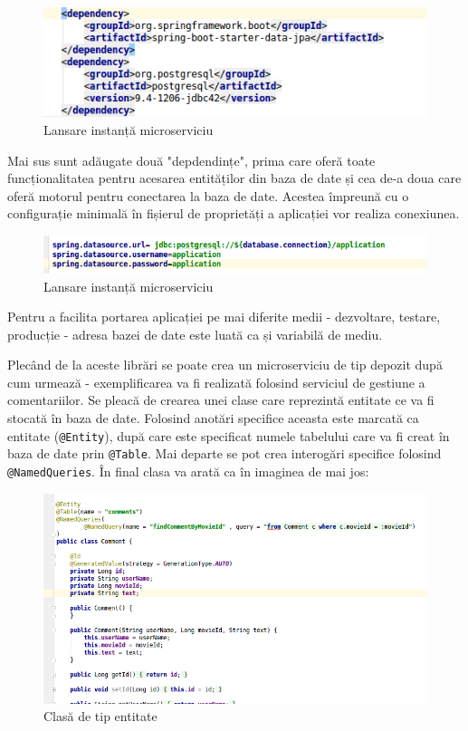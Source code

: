 \documentclass[12pt, a4paper, oneside, romanian]{teza-upb}
\begin{document}
\begin{figure}[ht]
\centering
\includegraphics[scale=0.6]{img/spring-boot-data-dependencies.png}
\caption{Lansare instanță microserviciu}
\label{fig:arhi_componente}
\end{figure}

Mai sus sunt adăugate două "depdendințe", prima care oferă toate funcționalitatea pentru acesarea entităților din baza de date și cea de-a doua care oferă motorul pentru conectarea la baza de date. Acestea împreună cu o configurație minimală în fișierul de proprietăți a aplicației vor realiza conexiunea.

\begin{figure}[ht]
\centering
\includegraphics[scale=0.6]{img/spring-boot-connexion-details.png}
\caption{Lansare instanță microserviciu}
\label{fig:arhi_componente}
\end{figure}

Pentru a facilita portarea aplicației pe mai diferite medii - dezvoltare, testare, producție - adresa bazei de date este luată ca și variabilă de mediu. 

Plecând de la aceste librări se poate crea un microserviciu de tip depozit după cum urmează - exemplificarea va fi realizată folosind serviciul de gestiune a comentariilor. Se pleacă de crearea unei clase care reprezintă entitate ce va fi stocată în baza de date. Folosind anotări specifice aceasta este marcată ca entitate (\texttt{@Entity}), după care este specificat numele tabelului care va fi creat în baza de date prin \texttt{@Table}. Mai departe se pot crea interogări specifice folosind \texttt{@NamedQueries}. În final clasa va arată ca în imaginea de mai jos:


\begin{figure}[ht]
\centering
\includegraphics[scale=0.5]{img/spring-boot-entity.png}
\caption{Clasă de tip entitate}
\label{fig:arhi_componente}
\end{figure}
\end{document}
